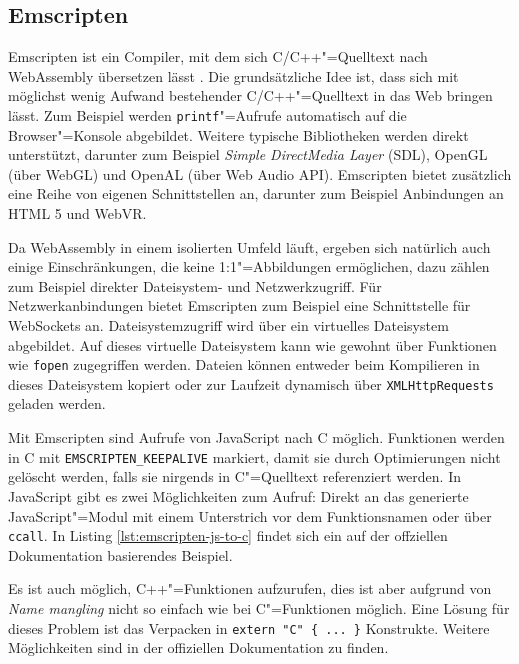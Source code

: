 \subsection{Emscripten}

Emscripten ist ein Compiler, mit dem sich C/C++"=Quelltext nach WebAssembly übersetzen lässt \cite{Emscripten}. Die grundsätzliche Idee ist, dass sich mit möglichst wenig Aufwand bestehender C/C++"=Quelltext in das Web bringen lässt. Zum Beispiel werden \lstinline{printf}"=Aufrufe automatisch auf die Browser"=Konsole abgebildet. Weitere typische Bibliotheken werden direkt unterstützt, darunter zum Beispiel \emph{Simple DirectMedia Layer} (SDL), OpenGL (über WebGL) und OpenAL (über Web Audio API). Emscripten bietet zusätzlich eine Reihe von eigenen Schnittstellen an, darunter zum Beispiel Anbindungen an HTML 5 und WebVR.

Da WebAssembly in einem isolierten Umfeld läuft, ergeben sich natürlich auch einige Einschränkungen, die keine 1:1"=Abbildungen ermöglichen, dazu zählen zum Beispiel direkter Dateisystem- und Netzwerkzugriff. Für Netzwerkanbindungen bietet Emscripten zum Beispiel eine Schnittstelle für WebSockets an. Dateisystemzugriff wird über ein virtuelles Dateisystem abgebildet. Auf dieses virtuelle Dateisystem kann wie gewohnt über Funktionen wie \lstinline{fopen} zugegriffen werden. Dateien können entweder beim Kompilieren in dieses Dateisystem kopiert oder zur Laufzeit dynamisch über \lstinline{XMLHttpRequests} geladen werden.

Mit Emscripten sind Aufrufe von JavaScript nach C möglich. Funktionen werden in C mit \lstinline{EMSCRIPTEN_KEEPALIVE} markiert, damit sie durch Optimierungen nicht gelöscht werden, falls sie nirgends in C"=Quelltext referenziert werden. In JavaScript gibt es zwei Möglichkeiten zum Aufruf: Direkt an das generierte JavaScript"=Modul mit einem Unterstrich vor dem Funktionsnamen oder über \lstinline{ccall}. In Listing \ref{lst:emscripten-js-to-c} findet sich ein auf der offziellen Dokumentation basierendes Beispiel.



Es ist auch möglich, C++"=Funktionen aufzurufen, dies ist aber aufgrund von \emph{Name mangling} nicht so einfach wie bei C"=Funktionen möglich. Eine Lösung für dieses Problem ist das Verpacken in \lstinline|extern "C" { ... }| Konstrukte. Weitere Möglichkeiten sind in der offiziellen Dokumentation zu finden.

